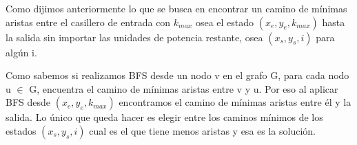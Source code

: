 Como dijimos anteriormente lo que se busca en encontrar un camino de mínimas aristas entre el casillero de entrada con $k_{max}$ osea el estado $(x_e,y_e,k_{max})$ hasta la salida sin importar las unidades de potencia restante, osea $(x_s,y_s,i)$ para algún i.

Como sabemos si realizamos BFS desde un nodo v en el grafo G, para cada nodo u $\in$ G, encuentra el camino de mínimas aristas entre v y u. Por eso al aplicar BFS desde $(x_e,y_e,k_{max})$ encontramos el camino de mínimas aristas entre él y la salida. Lo único que queda hacer es elegir entre los caminos mínimos de los estados  $(x_s,y_s,i)$ cual es el que tiene menos aristas y esa es la solución. 
